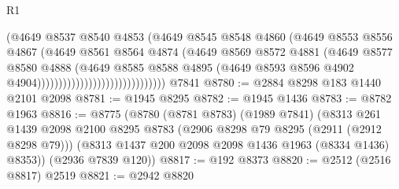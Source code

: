 \begin{lexlean}{R1}
\begin{coremodule}
                                                (@4649
                                                  @8537
                                                  @8540
                                                  @4853
                                                  (@4649
                                                    @8545
                                                    @8548
                                                    @4860
                                                    (@4649
                                                      @8553
                                                      @8556
                                                      @4867
                                                      (@4649
                                                        @8561
                                                        @8564
                                                        @4874
                                                        (@4649
                                                          @8569
                                                          @8572
                                                          @4881
                                                          (@4649
                                                            @8577
                                                            @8580
                                                            @4888
                                                            (@4649
                                                              @8585
                                                              @8588
                                                              @4895
                                                              (@4649
                                                                @8593
                                                                @8596
                                                                @4902
                                                                @4904))))))))))))))))))))))))))))))
    @7841
@8780 := @2884 @8298 @183 @1440 @2101 @2098
@8781 := @1945 @8295
@8782 := @1945 @1436
@8783 := @8782 @1963
@8816 := @8775
    (@8780
      (@8781 @8783)
      (@1989 @7841)
      (@8313
        @261
        @1439
        @2098
        @2100
        @8295
        @8783
        (@2906 @8298 @79 @8295 (@2911 (@2912 @8298 @79)))
        (@8313 @1437 @200 @2098 @2098 @1436 @1963 (@8334 @1436) @8353))
      (@2936 @7839 @120))
@8817 := @192 @8373
@8820 := @2512 (@2516 @8817) @2519
@8821 := @2942 @8820

\end{coremodule}
\end{lexlean}
